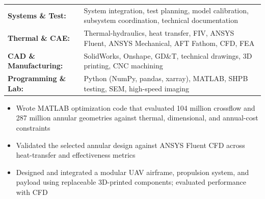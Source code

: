 \documentclass[10pt,letterpaper]{article}
\begin{document}
\vspace{2pt}
\researchEntry

\begin{tabularx}{\textwidth}{@{}>{\bfseries}l X@{}}
Systems \& Test: & System integration, test planning, model calibration, subsystem coordination, technical documentation \\
Thermal \& CAE: & Thermal-hydraulics, heat transfer, FIV, ANSYS Fluent, ANSYS Mechanical, AFT Fathom, CFD, FEA \\
CAD \& Manufacturing: & SolidWorks, Onshape, GD\&T, technical drawings, 3D printing, CNC machining \\
Programming \& Lab: & Python (NumPy, pandas, xarray), MATLAB, SHPB testing, SEM, high-speed imaging
\end{tabularx}

\begin{itemize}
  \item Wrote MATLAB optimization code that evaluated 104 million crossflow and 287 million annular geometries against thermal, dimensional, and annual-cost constraints
  \item Validated the selected annular design against ANSYS Fluent CFD across heat-transfer and effectiveness metrics
\end{itemize}
\begin{itemize}
  \item Designed and integrated a modular UAV airframe, propulsion system, and payload using replaceable 3D-printed components; evaluated performance with CFD
\end{itemize}
\end{document}
